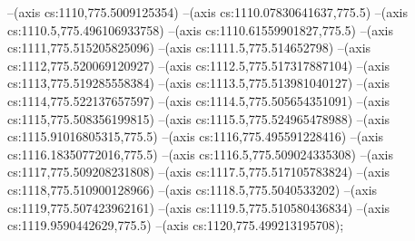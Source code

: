 --(axis cs:1110,775.5009125354)
--(axis cs:1110.07830641637,775.5)
--(axis cs:1110.5,775.496106933758)
--(axis cs:1110.61559901827,775.5)
--(axis cs:1111,775.515205825096)
--(axis cs:1111.5,775.514652798)
--(axis cs:1112,775.520069120927)
--(axis cs:1112.5,775.517317887104)
--(axis cs:1113,775.519285558384)
--(axis cs:1113.5,775.513981040127)
--(axis cs:1114,775.522137657597)
--(axis cs:1114.5,775.505654351091)
--(axis cs:1115,775.508356199815)
--(axis cs:1115.5,775.524965478988)
--(axis cs:1115.91016805315,775.5)
--(axis cs:1116,775.495591228416)
--(axis cs:1116.18350772016,775.5)
--(axis cs:1116.5,775.509024335308)
--(axis cs:1117,775.509208231808)
--(axis cs:1117.5,775.517105783824)
--(axis cs:1118,775.510900128966)
--(axis cs:1118.5,775.5040533202)
--(axis cs:1119,775.507423962161)
--(axis cs:1119.5,775.510580436834)
--(axis cs:1119.9590442629,775.5)
--(axis cs:1120,775.499213195708);

